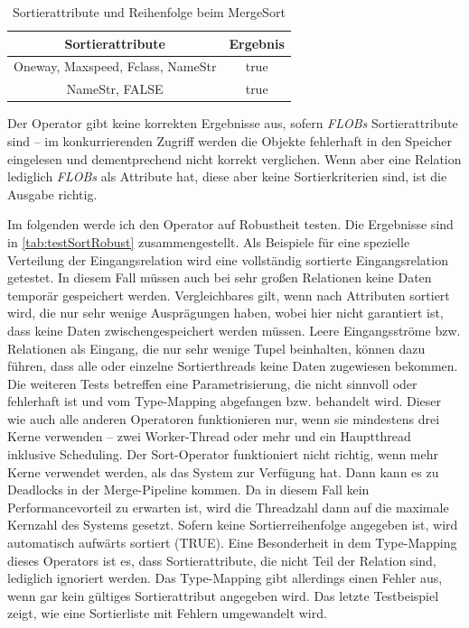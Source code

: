 \documentclass[a4paper,12pt,twoside]{article}
\newcommand{\Fb}[1]{\textit{#1}} %
\begin{document}
{\begin{table}
	\centering
	\begin{tabular}{|c|c|}
		\hline 
		Sortierattribute & Ergebnis \\ 
		\hline 
		 Oneway, Maxspeed, Fclass, NameStr &  true \\ 
		\hline 
		NameStr, FALSE &  true \\ 
		\hline 
	\end{tabular}
	\caption{\label{tab:testSortAttr} Sortierattribute und Reihenfolge beim MergeSort}
\end{table}

Der Operator gibt keine korrekten Ergebnisse aus, sofern \Fb{FLOBs} Sortierattribute sind -- im konkurrierenden Zugriff werden die Objekte fehlerhaft in den Speicher eingelesen und dementprechend nicht korrekt verglichen. Wenn aber eine Relation lediglich \Fb{FLOBs} als Attribute hat, diese aber keine Sortierkriterien sind, ist die Ausgabe richtig.

Im folgenden werde ich den Operator auf Robustheit testen. Die Ergebnisse sind in \autoref{tab:testSortRobust} zusammengestellt. Als Beispiele für eine spezielle Verteilung der Eingangsrelation wird eine vollständig sortierte Eingangsrelation getestet. In diesem Fall müssen auch bei sehr großen Relationen keine Daten temporär gespeichert werden. Vergleichbares gilt, wenn nach Attributen sortiert wird, die nur sehr wenige Ausprägungen haben, wobei hier nicht garantiert ist, dass keine Daten zwischengespeichert werden müssen. Leere Eingangsströme bzw. Relationen als Eingang, die nur sehr wenige Tupel beinhalten, können dazu führen, dass alle oder einzelne Sortierthreads keine Daten zugewiesen bekommen. Die weiteren Tests betreffen eine Parametrisierung, die nicht sinnvoll oder fehlerhaft ist und vom Type-Mapping abgefangen bzw. behandelt wird. Dieser wie auch alle anderen Operatoren funktionieren nur, wenn sie mindestens drei Kerne verwenden --  zwei Worker-Thread oder mehr und ein Hauptthread inklusive Scheduling. Der Sort-Operator funktioniert nicht richtig, wenn mehr Kerne verwendet werden, als das System zur Verfügung hat. Dann kann es zu Deadlocks in der Merge-Pipeline kommen. Da in diesem Fall kein Performancevorteil zu erwarten ist, wird die Threadzahl dann auf die maximale Kernzahl des Systems gesetzt. Sofern keine Sortierreihenfolge angegeben ist, wird automatisch aufwärts sortiert (TRUE). Eine Besonderheit in dem Type-Mapping dieses Operators ist es, dass Sortierattribute, die nicht Teil der Relation sind, lediglich ignoriert werden. Das Type-Mapping gibt allerdings einen Fehler aus, wenn gar kein gültiges Sortierattribut angegeben wird. Das letzte Testbeispiel zeigt, wie eine Sortierliste mit Fehlern umgewandelt wird.

}
\end{document}
